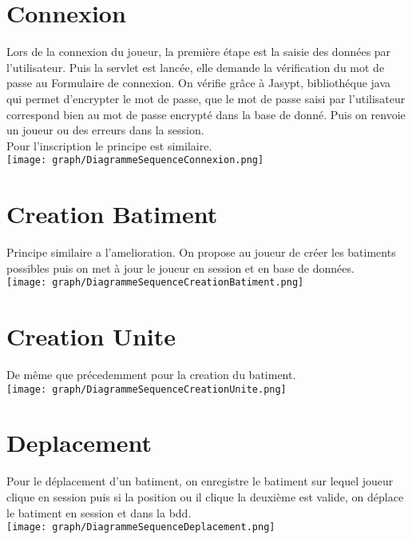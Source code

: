     \section{Connexion}

    Lors de la connexion du joueur, la première étape est la saisie des données par l'utilisateur. Puis la servlet est lancée, elle demande la vérification du mot de passe au Formulaire de connexion. On vérifie grâce à Jasypt, bibliothéque java qui permet d'encrypter le mot de passe, que le mot de passe saisi par l'utilisateur correspond bien au mot de passe encrypté dans la base de donné. Puis on renvoie un joueur ou des erreurs dans la session. \\
    Pour l'inscription le principe est similaire. \\
        \texttt{[image: graph/DiagrammeSequenceConnexion.png]}  
        
    \section{Creation Batiment}
    Principe similaire a l'amelioration. On propose au joueur de créer les batiments possibles puis on met à jour le joueur en session et en base de données. \\
        \texttt{[image: graph/DiagrammeSequenceCreationBatiment.png]}  
        
   \section{Creation Unite}
   De même que précedemment pour la creation du batiment. \\

        \texttt{[image: graph/DiagrammeSequenceCreationUnite.png]}    
        
   \section{Deplacement}

    Pour le déplacement d'un batiment, on enregistre le batiment sur lequel joueur clique en session puis si la position ou il clique la deuxième est valide, on déplace le batiment en session et dans la bdd. \\ 
    
        \texttt{[image: graph/DiagrammeSequenceDeplacement.png]}    
        
 
